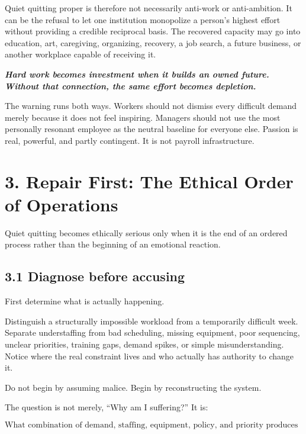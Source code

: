 \documentclass[11pt,oneside]{article}
\renewenvironment{quote}
  {\begin{tcolorbox}[
      enhanced,
      breakable,
      colback=ManifestLight,
      colframe=ManifestRule,
      boxrule=0pt,
      leftrule=3pt,
      arc=0pt,
      outer arc=0pt,
      left=10pt,right=10pt,top=8pt,bottom=8pt,
      before skip=0.8em,after skip=0.8em
    ]\itshape}
  {\end{tcolorbox}}
\begin{document}
Quiet quitting proper is therefore not necessarily anti-work or
anti-ambition. It can be the refusal to let one institution monopolize a
person's highest effort without providing a credible reciprocal basis.
The recovered capacity may go into education, art, caregiving,
organizing, recovery, a job search, a future business, or another
workplace capable of receiving it.

\begin{quote}
\textbf{Hard work becomes investment when it builds an owned future.
Without that connection, the same effort becomes depletion.}
\end{quote}

The warning runs both ways. Workers should not dismiss every difficult
demand merely because it does not feel inspiring. Managers should not
use the most personally resonant employee as the neutral baseline for
everyone else. Passion is real, powerful, and partly contingent. It is
not payroll infrastructure.

\section{3. Repair First: The Ethical Order of
Operations}\label{repair-first-the-ethical-order-of-operations}

Quiet quitting becomes ethically serious only when it is the end of an
ordered process rather than the beginning of an emotional reaction.

\subsection{3.1 Diagnose before
accusing}\label{diagnose-before-accusing}

First determine what is actually happening.

Distinguish a structurally impossible workload from a temporarily
difficult week. Separate understaffing from bad scheduling, missing
equipment, poor sequencing, unclear priorities, training gaps, demand
spikes, or simple misunderstanding. Notice where the real constraint
lives and who actually has authority to change it.

Do not begin by assuming malice. Begin by reconstructing the system.

The question is not merely, ``Why am I suffering?'' It is:

\[
\text{What combination of demand, staffing, equipment, policy, and priority produces this outcome?}
\]
\end{document}
